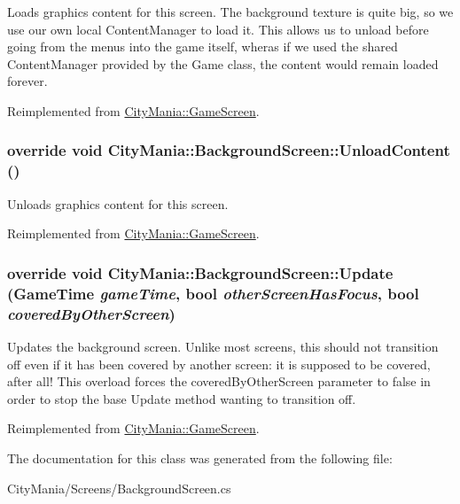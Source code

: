 Loads graphics content for this screen. The background texture is quite big, so we use our own local ContentManager to load it. This allows us to unload before going from the menus into the game itself, wheras if we used the shared ContentManager provided by the Game class, the content would remain loaded forever. 

Reimplemented from \hyperlink{classCityMania_1_1GameScreen_a4dc3798784fff49b20280903d796c94c}{CityMania::GameScreen}.\hypertarget{classCityMania_1_1BackgroundScreen_ac6997881fcbc2ef11ca6a4fb8d093b4b}{
\subsubsection[{UnloadContent}]{\setlength{\rightskip}{0pt plus 5cm}override void CityMania::BackgroundScreen::UnloadContent ()}}
\label{classCityMania_1_1BackgroundScreen_ac6997881fcbc2ef11ca6a4fb8d093b4b}


Unloads graphics content for this screen. 

Reimplemented from \hyperlink{classCityMania_1_1GameScreen_a038a86bacf5b7d62141477980312f49b}{CityMania::GameScreen}.\hypertarget{classCityMania_1_1BackgroundScreen_aee39777b1741e0c3608b13cdcf8068c3}{
\subsubsection[{Update}]{\setlength{\rightskip}{0pt plus 5cm}override void CityMania::BackgroundScreen::Update (GameTime {\em gameTime}, \/  bool {\em otherScreenHasFocus}, \/  bool {\em coveredByOtherScreen})}}
\label{classCityMania_1_1BackgroundScreen_aee39777b1741e0c3608b13cdcf8068c3}


Updates the background screen. Unlike most screens, this should not transition off even if it has been covered by another screen: it is supposed to be covered, after all! This overload forces the coveredByOtherScreen parameter to false in order to stop the base Update method wanting to transition off. 

Reimplemented from \hyperlink{classCityMania_1_1GameScreen_a7f0d5b33eca521dc7fcd89eec337ccf9}{CityMania::GameScreen}.

The documentation for this class was generated from the following file:\begin{DoxyCompactItemize}
\item 
CityMania/Screens/BackgroundScreen.cs\end{DoxyCompactItemize}
